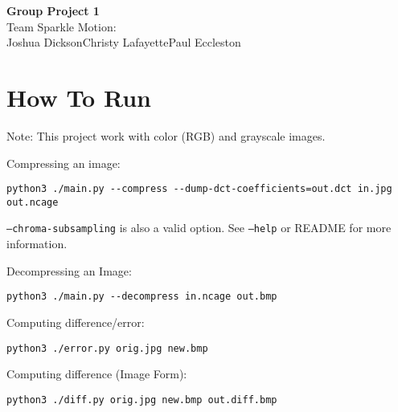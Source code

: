 \documentclass{article}
\begin{document}


\newcommand{\DropImageTwo}[2][]{%
	\begin{figure}[H]
		\centering
			\fbox{\texttt{[image: \#2]}}
		\caption{#1}
	\end{figure}
}


\newcommand{\DropImage}[2][]{%
	\begin{figure}[H]
		\centering
			\fbox{\texttt{[image: \#2]}}
		\caption{#1}
	\end{figure}
}

\begin{center}
{\Huge\textbf{Group Project 1}} \\
{\Large Team Sparkle Motion:} \\
{Joshua Dickson\hspace*{2ex}Christy Lafayette\hspace*{2ex}Paul Eccleston}
\end{center}
\vspace*{4ex}


\section{How To Run}

Note: This project work with color (RGB) and grayscale images.

\noindent
Compressing an image:
\begin{lstlisting}
python3 ./main.py --compress --dump-dct-coefficients=out.dct in.jpg out.ncage
\end{lstlisting}

\noindent
\texttt{--chroma-subsampling} is also a valid option.  See \texttt{--help} or
README for more information.


\noindent
Decompressing an Image:
\begin{lstlisting}
python3 ./main.py --decompress in.ncage out.bmp
\end{lstlisting}


\noindent
Computing difference/error:
\begin{lstlisting}
python3 ./error.py orig.jpg new.bmp
\end{lstlisting}


\noindent
Computing difference (Image Form):
\begin{lstlisting}
python3 ./diff.py orig.jpg new.bmp out.diff.bmp
\end{lstlisting}
\end{document}

